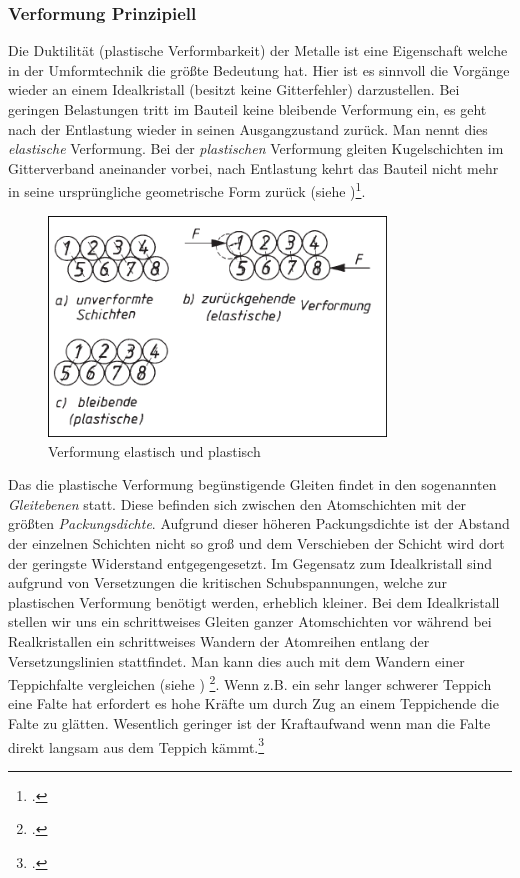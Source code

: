 \documentclass[12pt,a4paper,parskip]{scrartcl}
\begin{document}
{\subsubsection{Verformung Prinzipiell}
Die Duktilität (plastische Verformbarkeit) der Metalle ist eine Eigenschaft welche in der Umformtechnik die größte Bedeutung hat. Hier ist es sinnvoll die Vorgänge wieder an einem Idealkristall (besitzt keine Gitterfehler) darzustellen. Bei geringen Belastungen tritt im Bauteil keine bleibende Verformung ein, es geht nach  der Entlastung wieder in seinen Ausgangzustand zurück. Man nennt dies \emph{elastische} Verformung. Bei der \emph{plastischen} Verformung gleiten Kugelschichten im Gitterverband aneinander vorbei,  nach Entlastung kehrt das Bauteil nicht mehr in seine ursprüngliche geometrische Form zurück (siehe )\footcite[Vgl.][45]{wk}.
\begin{figure}
\centering
\includegraphics[width=0.8\textwidth]{eloplastkristall}
\caption{Verformung elastisch und plastisch}
\label{fig:eloplastkristall} 
\end{figure}
Das die plastische Verformung begünstigende Gleiten findet in den sogenannten \emph{Gleitebenen} statt. Diese befinden sich zwischen den Atomschichten mit der größten \emph{Packungsdichte}. Aufgrund dieser höheren Packungsdichte ist der Abstand der einzelnen Schichten nicht so groß und dem Verschieben der Schicht wird dort der  geringste Widerstand entgegengesetzt. Im Gegensatz zum Idealkristall sind aufgrund von Versetzungen die kritischen Schubspannungen, welche zur plastischen Verformung benötigt werden,  erheblich kleiner. Bei dem Idealkristall stellen wir uns ein schrittweises Gleiten ganzer Atomschichten vor während bei Realkristallen ein schrittweises Wandern der Atomreihen entlang der Versetzungslinien stattfindet. Man kann dies auch mit dem Wandern einer Teppichfalte vergleichen (siehe ) \footcite[Vgl.][53]{wk}. Wenn z.B. ein sehr langer schwerer Teppich eine Falte hat erfordert es hohe Kräfte um durch Zug an einem Teppichende die Falte zu glätten. Wesentlich geringer ist der Kraftaufwand wenn man die Falte direkt langsam aus dem Teppich kämmt.\footcite[Vgl.][45-53]{wk}
}
\end{document}
